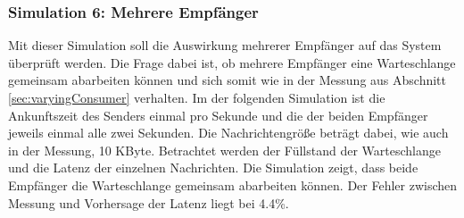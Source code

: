 \subsubsection{Simulation 6: Mehrere Empfänger}
Mit dieser Simulation soll die Auswirkung mehrerer Empfänger auf das System überprüft werden. Die Frage dabei ist, ob mehrere Empfänger eine Warteschlange gemeinsam abarbeiten können und sich somit wie in der Messung aus Abschnitt \ref{sec:varyingConsumer} verhalten. Im der folgenden Simulation ist die Ankunftszeit des Senders einmal pro Sekunde und die der beiden Empfänger jeweils einmal alle zwei Sekunden. Die Nachrichtengröße beträgt dabei, wie auch in der Messung, 10 KByte. Betrachtet werden der Füllstand der Warteschlange und die Latenz der einzelnen Nachrichten. 
Die Simulation zeigt, dass beide Empfänger die Warteschlange gemeinsam abarbeiten können. Der Fehler zwischen Messung und Vorhersage der Latenz liegt bei 4.4\%. 







